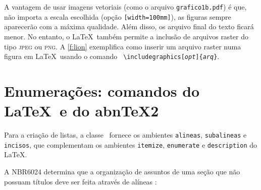 A vantagem de usar imagens vetoriais (como o arquivo \texttt{grafico1b.pdf}) é
que, não importa a escala escolhida (opção \texttt{[width=100mm]}), as figuras
sempre aparecerão com a máxima qualidade. Além disso, os arquivo final do 
texto ficará menor. No entanto, o \LaTeX\ também permite a inclusão de arquivos
raster do tipo \textsc{jpeg} ou  \textsc{png}. A \autoref{f:lion} exemplifica como
inserir um arquivo raster numa figura em \LaTeX\ usando o comando \texttt{%
\textbackslash{}includegraphics[\textrm{\emph{opt}}]\{\textrm{\emph{arq}}\}}.


\section{Enumerações: comandos do \LaTeX\ e do {abn\TeX{}2}}

Para a criação de listas, a classe \abnTeX\ fornece os 
ambientes \texttt{alineas}, \texttt{subalineas} e \texttt{incisos}, 
que complementam os ambientes \texttt{itemize}, \texttt{enumerate}
e \texttt{description} do \LaTeX. 

 A NBR6024 
 determina que a organização
de assuntos de uma seção que não possuam títulos deve ser
feita através de alíneas \cite[item~4.2]{NBR6024:2012}:

